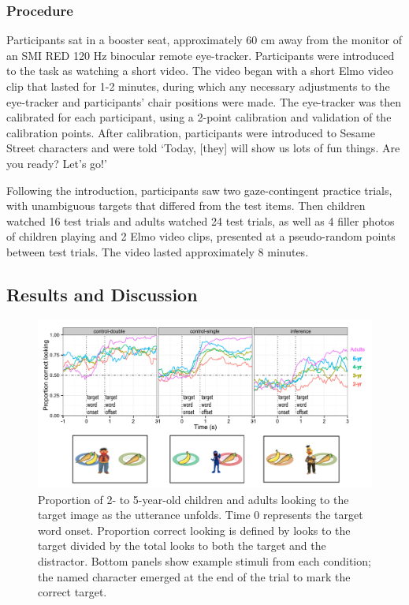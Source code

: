 \documentclass[10pt,letterpaper]{article}
\begin{document}
\subsubsection{Procedure}

Participants sat in a booster seat, approximately 60 cm away from the monitor of an SMI RED 120 Hz binocular remote eye-tracker. Participants were introduced to the task as watching a short video. The video began with a short Elmo video clip that lasted for 1-2 minutes, during which any necessary adjustments to the eye-tracker and participants' chair positions were made. The eye-tracker was then calibrated for each participant, using a 2-point calibration and validation of the calibration points. After calibration, participants were introduced to Sesame Street characters and were told `Today, [they] will show us lots of fun things. Are you ready? Let's go!'

Following the introduction, participants saw two gaze-contingent practice trials, with unambiguous targets that differed from the test items. Then children watched 16 test trials and adults watched 24 test trials, as well as 4 filler photos of children playing and 2 Elmo video clips, presented at a pseudo-random points between test trials. The video lasted approximately 8 minutes.

\subsection{Results and Discussion}


\begin{figure}[t]
\begin{center} 
  \includegraphics[width=.8\textwidth]{figures/140521-simpimp_age-edit.pdf}
  \caption{\label{fig:age} Proportion of 2- to 5-year-old children and adults looking to the target image as the utterance unfolds. Time 0 represents the target word onset. Proportion correct looking is defined by looks to the target divided by the total looks to both the target and the distractor. Bottom panels show example stimuli from each condition; the named character emerged at the end of the trial to mark the correct target.}
  \end{center} 
\end{figure}
\end{document}
